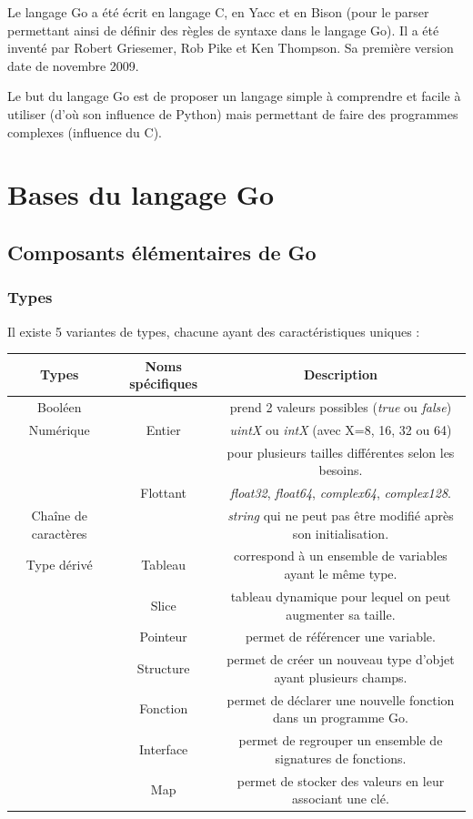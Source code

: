 \documentclass[11pt]{article}
\begin{document}
Le langage Go a été écrit en langage C, en Yacc et en Bison (pour le parser permettant ainsi de définir des règles de syntaxe dans le langage Go). Il a été inventé par Robert Griesemer, Rob Pike et Ken Thompson. Sa première version date de novembre 2009. 

Le but du langage Go est de proposer un langage simple à comprendre et facile à utiliser (d'où son influence de Python) mais permettant de faire des programmes complexes (influence du C). 


\section{Bases du langage Go}

\subsection{Composants élémentaires de Go}

\subsubsection{Types}

Il existe 5 variantes de types, chacune ayant des caractéristiques uniques : 

\begin{tabular}[h]{|c|c|c|}
	\hline
	Types & Noms spécifiques & Description \\
	\hline
	Booléen & & prend 2 valeurs possibles (\textit{true} ou \textit{false}) \\
	\hline
	Numérique & Entier & \textit{uintX} ou \textit{intX} (avec X=8, 16, 32 ou 64) \\
	 & & pour plusieurs tailles différentes selon les besoins. \\
	& Flottant &  \textit{float32}, \textit{float64}, \textit{complex64}, \textit{complex128}. \\
	\hline 
	Chaîne de caractères & & \textit{string} qui ne peut pas être modifié après son initialisation. \\
	\hline
	Type dérivé & Tableau & correspond à un ensemble de variables ayant le même type. \\
	 & Slice & tableau dynamique pour lequel on peut augmenter sa taille. \\
	 & Pointeur & permet de référencer une variable. \\
	 & Structure & permet de créer un nouveau type d'objet ayant plusieurs champs. \\
	 & Fonction & permet de déclarer une nouvelle fonction dans un programme Go. \\
	 & Interface & permet de regrouper un ensemble de signatures de fonctions. \\
	 & Map & permet de stocker des valeurs en leur associant une clé. \\
	 \hline 
	
\end{tabular}
\end{document}
